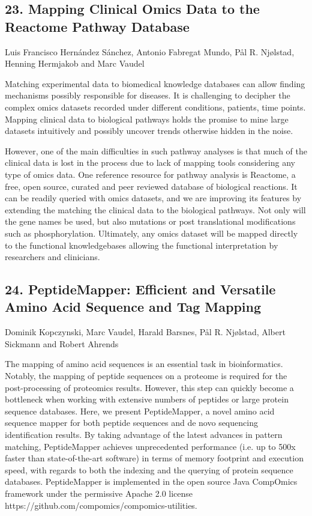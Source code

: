 \subsection*{\color{eubicRed} 23. Mapping Clinical Omics Data to the Reactome Pathway Database}
{\color{eubicGray}Luis Francisco Hernández Sánchez, Antonio Fabregat Mundo, Pål R. Njølstad, Henning Hermjakob and Marc Vaudel}

Matching experimental data to biomedical knowledge databases can allow finding mechanisms possibly responsible for diseases. It is challenging to decipher the complex omics datasets recorded under different conditions, patients, time points. Mapping clinical data to biological pathways holds the promise to mine large datasets intuitively and possibly uncover trends otherwise hidden in the noise.

However, one of the main difficulties in such pathway analyses is that much of the clinical data is lost in the process due to lack of mapping tools considering any type of omics data. One reference resource for pathway analysis is Reactome, a free, open source, curated and peer reviewed database of biological reactions. It can be readily queried with omics datasets, and we are improving its features by extending the matching the clinical data to the biological pathways.
Not only will the gene names be used, but also mutations or post translational modifications such as phosphorylation. Ultimately, any omics dataset will be mapped directly to the functional knowledgebases allowing the functional interpretation by researchers and clinicians.

\subsection*{\color{eubicRed} 24. PeptideMapper: Efficient and Versatile Amino Acid Sequence and Tag Mapping}
{\color{eubicGray}Dominik Kopczynski, Marc Vaudel, Harald Barsnes, Pål R. Njølstad, Albert Sickmann and Robert Ahrends}

The mapping of amino acid sequences is an essential task in bioinformatics. Notably, the mapping of peptide sequences on a proteome is required for the post-processing of proteomics results. However, this step can quickly become a bottleneck when working with extensive numbers of peptides or large protein sequence databases. Here, we present PeptideMapper, a novel amino acid sequence mapper for both peptide sequences and de novo sequencing identification results. By taking advantage of the latest advances in pattern matching, PeptideMapper achieves unprecedented performance (i.e. up to 500x faster than state-of-the-art software) in terms of memory footprint and execution speed, with regards to both the indexing and the querying of protein sequence databases. PeptideMapper is implemented in the open source Java CompOmics framework under the permissive Apache 2.0 license https://github.com/compomics/compomics-utilities.

